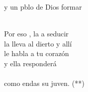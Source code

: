 \documentclass[12pt]{article}
\begin{document}
\begin{multicols*}{2}
\begin{cancion}
	y un pblo de Dios formar  \\\jump\\
	\begin{chorus}%
	Por eso , la  a seducir\\
	la lleva al dierto y allí\\
	le habla a tu corazón \\
	y ella  responderá\\
{}\vspace*{-0.4cm}\\
	como endas su juven. (**)\\
	\end{chorus}%
	\jump\\
\end{cancion}%


\end{multicols*}
\end{document}
